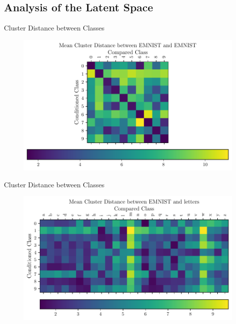\documentclass[aspectratio=169]{beamer}
\begin{document}
\subsection{Analysis of the Latent Space}

\begin{frame}{Cluster Distance between Classes}
\begin{figure}[htpb]
	\includegraphics[height=0.7\textheight]{figures/samples/emnist_distance_matrix_EMNIST_lda.pdf}
\end{figure}
\end{frame}

\begin{frame}{Cluster Distance between Classes}
\begin{figure}[htpb]
	\includegraphics[height=0.7\textheight]{figures/samples/emnist_distance_matrix_letters_lda.pdf}
\end{figure}
\end{frame}
\end{document}
